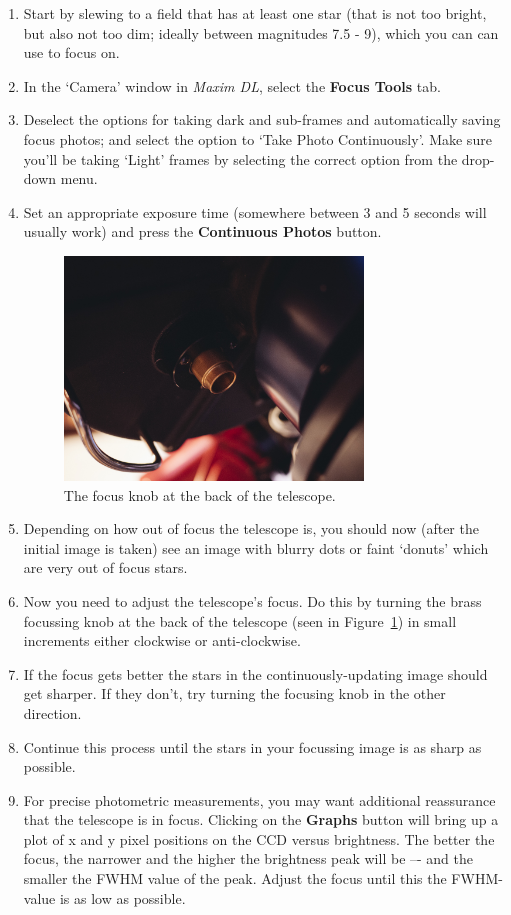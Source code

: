 \documentclass[12pt,twoside,a4paper]{report}
\begin{document}
\begin{enumerate}
 \item Start by slewing to a field that has at least one star (that is not too bright, but also not too dim; ideally between magnitudes 7.5 - 9), which you can can use to focus on.
 \item In the `Camera' window in \emph{Maxim DL}, select the \textbf{Focus Tools} tab. 
 \item Deselect the options for taking dark and sub-frames and automatically saving focus photos; and select the option to `Take Photo Continuously'. Make sure you'll be taking `Light' frames by selecting the correct option from the drop-down menu.
 \item Set an appropriate exposure time (somewhere between 3 and 5 seconds will usually work) and press the \textbf{Continuous Photos} button.

 \begin{figure}[ht]
  \centering
    \includegraphics[width=0.75\textwidth]{documentation_images/focus_knob.jpg}
    \caption{\label{fig:focus_knob}The focus knob at the back of the telescope.}
 \end{figure}

 \item Depending on how out of focus the telescope is, you should now (after the initial image is taken) see an image with blurry dots or faint `donuts' which are very out of focus stars.
 \item Now you need to adjust the telescope's focus. Do this by turning the brass focussing knob at the back of the telescope (seen in Figure~\ref{fig:focus_knob}) in small increments either clockwise or anti-clockwise.
 \item If the focus gets better the stars in the continuously-updating image should get sharper. If they don't, try turning the focusing knob in the other direction. 
 \item Continue this process until the stars in your focussing image is as sharp as possible.
 \item For precise photometric measurements, you may want additional reassurance that the telescope is in focus. Clicking on the \textbf{Graphs} button will bring up a plot of x and y pixel positions on the CCD versus brightness. The better the focus, the narrower and the higher the brightness peak will be –- and the smaller the FWHM value of the peak. Adjust the focus until this the FWHM-value is as low as possible.
\end{enumerate}
\end{document}
